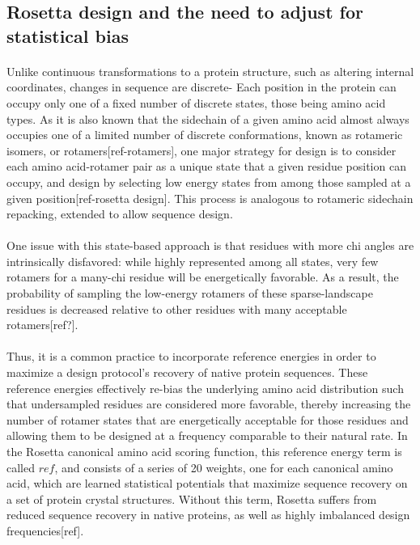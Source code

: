 \subsection{Rosetta design and the need to adjust for statistical bias}
\paragraph{}
Unlike continuous transformations to a protein structure, such as altering internal coordinates, changes in sequence are discrete- Each position in the protein can occupy only one of a fixed number of discrete states, those being amino acid types.
As it is also known that the sidechain of a given amino acid almost always occupies one of a limited number of discrete conformations, known as rotameric isomers, or rotamers[ref-rotamers], one major strategy for design is to consider each amino acid-rotamer pair as a unique state that a given residue position can occupy, and design by selecting low energy states from among those sampled at a given position[ref-rosetta design].
This process is analogous to rotameric sidechain repacking, extended to allow sequence design.

\paragraph{}
One issue with this state-based approach is that residues with more chi angles are intrinsically disfavored: while highly represented among all states, very few rotamers for a many-chi residue will be energetically favorable.
As a result, the probability of sampling the low-energy rotamers of these sparse-landscape residues is decreased relative to other residues with many acceptable rotamers[ref?].

\paragraph{}
Thus, it is a common practice to incorporate reference energies in order to maximize a design protocol's recovery of native protein sequences.
These reference energies effectively re-bias the underlying amino acid distribution such that undersampled residues are considered more favorable, thereby increasing the number of rotamer states that are energetically acceptable for those residues and allowing them to be designed at a frequency comparable to their natural rate. 
In the Rosetta canonical amino acid scoring function, this reference energy term is called $ref$, and consists of a series of 20 weights, one for each canonical amino acid, which are learned statistical potentials that maximize sequence recovery on a set of protein crystal structures. Without this term, Rosetta suffers from reduced sequence recovery in native proteins, as well as highly imbalanced design frequencies[ref].

